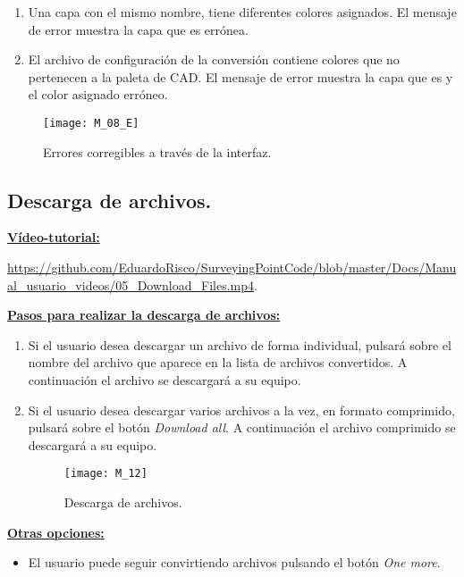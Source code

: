 \begin{enumerate}
\item Una capa con el mismo nombre, tiene diferentes colores asignados. El mensaje de error muestra la capa que es errónea.

\item El archivo de configuración de la conversión contiene colores que no pertenecen a la paleta de CAD. El mensaje de error muestra la capa que es y el color asignado erróneo.

\end{enumerate}
\begin{figure}[H]
	\centering
	\texttt{[image: M\_08\_E]}
	\caption{Errores corregibles a través de la interfaz.}
	\label{fig:M_08_E}
\end{figure}

\subsection{Descarga de archivos.}

\textbf{\underline{Vídeo-tutorial:}}

\url{https://github.com/EduardoRisco/SurveyingPointCode/blob/master/Docs/Manual_usuario_videos/05_Download_Files.mp4}.

\textbf{\underline{Pasos para realizar la descarga de archivos:} }

\begin{enumerate}

\item Si el usuario desea descargar un archivo de forma individual, pulsará sobre el nombre del archivo que aparece en la lista de archivos convertidos. A continuación el archivo se descargará a su equipo.

\item Si el usuario desea descargar varios archivos a la vez, en formato comprimido, pulsará sobre el botón \emph{Download all}. A continuación el archivo comprimido se descargará a su equipo.

\begin{figure}[H]
	\centering
	\texttt{[image: M\_12]}
	\caption{Descarga de archivos.}
	\label{fig:M_12}
\end{figure}

\end{enumerate} 



\textbf{\underline{Otras opciones:} }

\begin{itemize}

\item El usuario puede seguir convirtiendo archivos pulsando el botón \emph{One more}.

\end{itemize}

